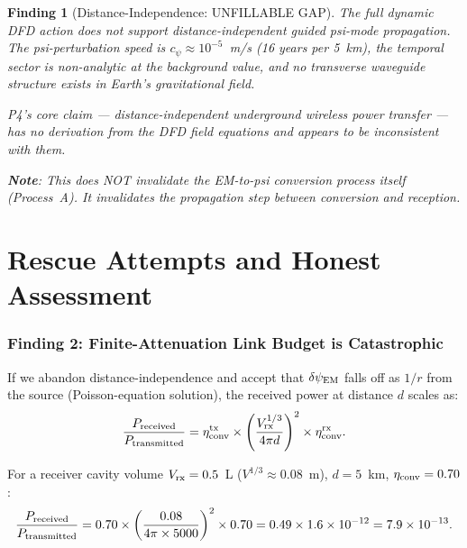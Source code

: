 \documentclass[11pt]{article}
\newtheorem{finding}{Finding}
\newcommand{\ee}[1]{\times 10^{#1}}
\begin{document}
\begin{finding}[Distance-Independence: UNFILLABLE GAP]
\label{find:distance-gap}
The full dynamic DFD action does not support distance-independent
guided psi-mode propagation. The psi-perturbation speed is
$c_\psi \approx 10^{-5}$~m/s (16 years per 5~km), the temporal
sector is non-analytic at the background value, and no transverse
waveguide structure exists in Earth's gravitational field.

P4's core claim --- distance-independent underground wireless power
transfer --- has no derivation from the DFD field equations and
appears to be inconsistent with them.

\textbf{Note}: This does NOT invalidate the EM-to-psi conversion
process itself (Process~A). It invalidates the propagation step
between conversion and reception.
\end{finding}

\part{Rescue Attempts and Honest Assessment}
\label{part:rescue}

\section{Finding 2: Finite-Attenuation Link Budget is Catastrophic}
\label{sec:link-budget}

If we abandon distance-independence and accept that $\delta\psi_{\rm EM}$
falls off as $1/r$ from the source (Poisson-equation solution), the
received power at distance $d$ scales as:
\begin{equation}
\frac{P_{\rm received}}{P_{\rm transmitted}} =
\eta_{\rm conv}^{\rm tx} \times \left(\frac{V_{\rm rx}^{1/3}}{4\pi d}\right)^2
\times \eta_{\rm conv}^{\rm rx}.
\end{equation}

For a receiver cavity volume $V_{\rm rx} = 0.5$~L ($V^{1/3} \approx 0.08$~m),
$d = 5$~km, $\eta_{\rm conv} = 0.70$:
\begin{equation}
\frac{P_{\rm received}}{P_{\rm transmitted}} = 0.70 \times
\left(\frac{0.08}{4\pi \times 5000}\right)^2 \times 0.70
= 0.49 \times 1.6\ee{-12} = 7.9\ee{-13}.
\end{equation}
\end{document}
